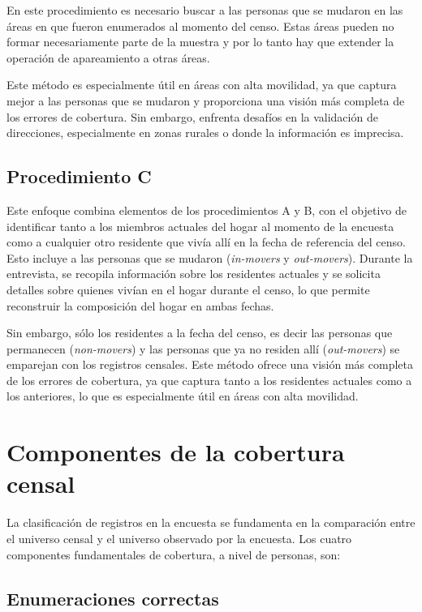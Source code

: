 \documentclass[
  12pt,
]{book}
\begin{document}
En este procedimiento es necesario buscar a las personas que se mudaron en las áreas en que fueron enumerados al momento del censo. Estas áreas pueden no formar necesariamente parte de la muestra y por lo tanto hay que extender la operación de apareamiento a otras áreas.

Este método es especialmente útil en áreas con alta movilidad, ya que captura mejor a las personas que se mudaron y proporciona una visión más completa de los errores de cobertura. Sin embargo, enfrenta desafíos en la validación de direcciones, especialmente en zonas rurales o donde la información es imprecisa.

\subsection{Procedimiento C}\label{procedimiento-c}

Este enfoque combina elementos de los procedimientos A y B, con el objetivo de identificar tanto a los miembros actuales del hogar al momento de la encuesta como a cualquier otro residente que vivía allí en la fecha de referencia del censo. Esto incluye a las personas que se mudaron (\emph{in-movers} y \emph{out-movers}). Durante la entrevista, se recopila información sobre los residentes actuales y se solicita detalles sobre quienes vivían en el hogar durante el censo, lo que permite reconstruir la composición del hogar en ambas fechas.

Sin embargo, sólo los residentes a la fecha del censo, es decir las personas que permanecen (\emph{non-movers}) y las personas que ya no residen allí (\emph{out-movers}) se emparejan con los registros censales. Este método ofrece una visión más completa de los errores de cobertura, ya que captura tanto a los residentes actuales como a los anteriores, lo que es especialmente útil en áreas con alta movilidad.

\section{Componentes de la cobertura censal}\label{componentes-de-la-cobertura-censal}

La clasificación de registros en la encuesta se fundamenta en la comparación entre el universo censal y el universo observado por la encuesta. Los cuatro componentes fundamentales de cobertura, a nivel de personas, son:

\subsection{Enumeraciones correctas}\label{enumeraciones-correctas}
\end{document}
